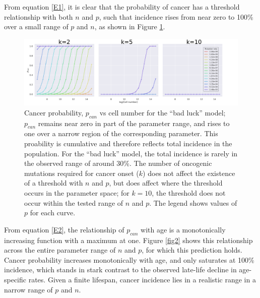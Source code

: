 \documentclass[9pt,twocolumn,twoside]{pnas-new}
\begin{document}
From equation \ref{E1}, it is clear that the probability of cancer has a threshold relationship with both $n$ and $p$, such that incidence rises from near zero to 100\% over a small range of $p$ and $n$, as shown in Figure \ref{fig1}.

\begin{figure}[!th]
	\centering
	\includegraphics[width=\linewidth]{fig1.png}
	\caption{Cancer probability, $p_{can}$ vs cell number for the ``bad luck'' model; $p_{can}$ remains near zero in part of the parameter range, and rises to one over a narrow region of the corresponding parameter. This proability is cumulative and therefore reflects total incidence in the population. For the ``bad luck'' model, the total incidence is rarely in the observed range of around 30\%. The number of oncogenic mutations required for cancer onset ($k$) does not affect the existence of a threshold with $n$ and $p$, but does affect where the threshold occurs in the parameter space; for $k=10$, the threshold does not occur within the tested range of $n$ and $p$. The legend shows values of $p$ for each curve.}
	\label{fig1}
\end{figure}

From equation \ref{E2}, the relationship of $p_{can}$ with age is a monotonically increasing function with a maximum at one. Figure \ref{fig2} shows this relationship across the entire parameter range of $n$ and $p$, for which this prediction holds. Cancer probability increases monotonically with age, and only saturates at 100\% incidence, which stands in stark contrast to the observed late-life decline in age-specific rates. Given a finite lifespan, cancer incidence lies in a realistic range in a narrow range of $p$ and $n$.
\end{document}

